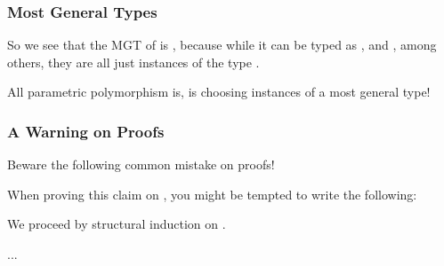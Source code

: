 \documentclass[aspectratio=169, handout]{beamer}
\begin{document}
\begin{frame}[fragile]
  \frametitle{Most General Types}

  So we see that the MGT of  is ,
  because while it can be typed as , and
  , among others, they are all just instances
  of the type .

  \pause
  \vspace{\fill}

  All parametric polymorphism is, is choosing instances of a most general
  type!

  \pause
  \vspace{\fill}

\end{frame}

\begin{frame}[fragile]
  \frametitle{A Warning on Proofs}

  Beware the following common mistake on proofs!

  \pause
  \vspace{\fill}


  \pause
  \vspace{\fill}

  When proving this claim on , you might be tempted to
  write the following:

  \pause
  \vspace{\fill}

  We proceed by structural induction on .

  \vspace{\fill}


  \vspace{\fill}

  ...
\end{frame}
\end{document}
